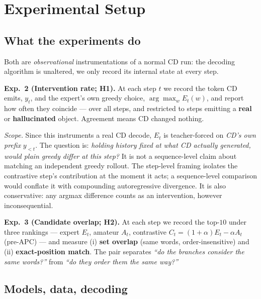 
\section{Experimental Setup}
\label{sec:cdmech-setup}

\subsection{What the experiments do}
\label{subsec:cdmech-what}

Both are \emph{observational} instrumentations of a normal CD run: the decoding
algorithm is unaltered, we only record its internal state at every step.

\textbf{Exp.~2 (Intervention rate; H1).} At each step $t$ we record the token CD
emits, $y_t$, and the expert's own greedy choice, $\arg\max_w E_t(w)$, and
report how often they coincide --- over all steps, and restricted to steps
emitting a \textbf{real} or \textbf{hallucinated} object. Agreement means CD
changed nothing.

\emph{Scope.} Since this instruments a real CD decode, $E_t$ is teacher-forced
on \emph{CD's own prefix} $y_{<t}$. The question is: \emph{holding history fixed
at what CD actually generated, would plain greedy differ at this step?} It is
not a sequence-level claim about matching an independent greedy rollout. The
step-level framing isolates the contrastive step's contribution at the moment it
acts; a sequence-level comparison would conflate it with compounding
autoregressive divergence. It is also conservative: any argmax difference counts
as an intervention, however inconsequential.

\textbf{Exp.~3 (Candidate overlap; H2).} At each step we record the top-$10$
under three rankings --- expert $E_t$, amateur $A_t$, contrastive
$C_t=(1{+}\alpha)E_t-\alpha A_t$ (pre-APC) --- and measure (i) \textbf{set
overlap} (same words, order-insensitive) and (ii) \textbf{exact-position match}.
The pair separates \emph{``do the branches consider the same words?''} from
\emph{``do they order them the same way?''}

\subsection{Models, data, decoding}
\label{subsec:cdmech-models}

